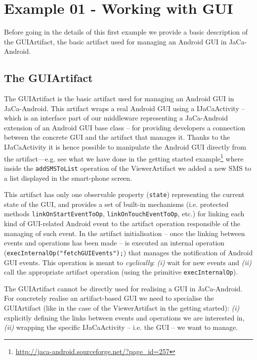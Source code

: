 \documentclass[11pt]{report}
\newcommand\code[1]{{\mbox{\texttt{{#1}}}}}
\newcommand{\jacandroid}{\textsf{JaCa-Android}}
\begin{document}
\section{Example 01 - Working with GUI}

Before going in the details of this first example we provide a basic description of the \textsf{GUIArtifact}, the basic artifact used for managing an Android GUI in \jacandroid{}.


\subsection{The \textsf{GUIArtifact}}
The \textsf{GUIArtifact} is the basic artifact used for managing an Android GUI in \jacandroid{}.
%
This artifact wraps a real Android GUI using a \textsf{\textsf{IJaCaActivity}} -- which is an interface part of our middleware representing a \jacandroid{} extension of an Android GUI base class  -- for providing developers a connection between the concrete GUI and the artifact that manages it.
%
Thanks to the \textsf{\textsf{IJaCaActivity}} it is hence possible to manipulate the Android GUI directly from the artifact---e.g. see what we have done in the getting started example\footnote{\url{http://jaca-android.sourceforge.net/?page_id=257}} where inside the \code{addSMSToList} operation of the \textsf{ViewerArtifact} we added a new SMS to a list displayed in the smart-phone screen.

%
This artifact has only one observable property (\code{state}) representing the current state of the GUI, and provides a set of built-in mechanisms (i.e. protected methods \code{linkOnStartEventToOp}, \code{linkOnTouchEventToOp}, etc.) for linking each kind of GUI-related Android event to the artifact operation responsible of the managing of such event.
%
In the artifact initialisation -- once the linking between events and operations has been made -- is executed an internal operation (\code{execInternalOp("fetchGUIEvents");}) that manages the notification of Android GUI events. This operation is meant to \textit{cyclically}: \textit{(i)} wait for new events and \textit{(ii)} call the appropriate artifact operation (using the primitive \code{execInternalOp}).

%
The \textsf{GUIArtifact} cannot be directly used for realising a GUI in \jacandroid{}. For concretely realise an artifact-based GUI we need to specialise the \textsf{GUIArtifact} (like in the case of the \textsf{ViewerArtifact} in the getting started): \textit{(i)} explicitly defining the links between events and operations we are interested in, \textit{(ii)} wrapping the specific \textsf{IJaCaActivity} -- i.e. the GUI -- we want to manage.
%
\end{document}
